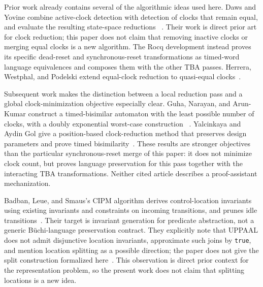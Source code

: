 Prior work already contains several of the algorithmic ideas used here.
Daws and Yovine combine active-clock detection with detection of clocks
that remain equal, and evaluate the resulting state-space reductions
~\cite{daws_yovine_rtss1996}. Their work is direct prior art for clock
reduction; this paper does not claim that removing inactive clocks or merging
equal clocks is a new algorithm. The Rocq development instead proves its
specific dead-reset and synchronous-reset transformations as timed-word
language equivalences and composes them with the other TBA passes.
Herrera, Westphal, and Podelski extend equal-clock reduction to quasi-equal
clocks~\cite{herrera_westphal_podelski_tacas2014}.

Subsequent work makes the distinction between a local reduction pass and a
global clock-minimization objective especially clear. Guha, Narayan, and
Arun-Kumar construct a timed-bisimilar automaton with the least possible
number of clocks, with a doubly exponential worst-case construction
~\cite{guha_narayan_arunkumar_concur2014}. Yalcinkaya and Aydin Gol give a
position-based clock-reduction method that preserves design parameters and
prove timed bisimilarity~\cite{yalcinkaya_aydin_gol_formalise2019}. These
results are stronger objectives than the particular synchronous-reset
merge of this paper: it does not minimize clock count, but proves language preservation
for this pass together with the interacting TBA transformations.
Neither cited article describes a proof-assistant mechanization.

Badban, Leue, and Smaus's CIPM algorithm derives control-location
invariants using existing invariants and constraints on incoming transitions,
and prunes idle transitions~\cite{badban_etal_wing2010}. Their target is
invariant generation for predicate abstraction, not a generic B\"uchi-language
preservation contract. They explicitly note that UPPAAL does not admit
disjunctive location invariants, approximate such joins by \texttt{true}, and
mention location splitting as a possible direction; the paper does not give
the split construction formalized here~\cite{badban_etal_wing2010}. This
observation is direct prior context for the representation problem, so the
present work does not claim that splitting locations is a new idea.


